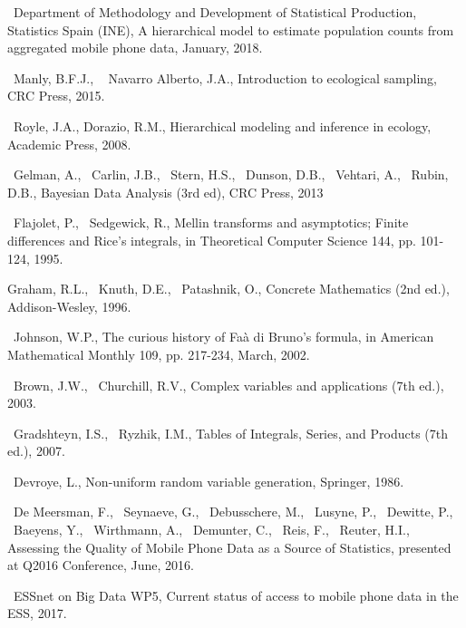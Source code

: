 \documentclass[12pt, a4paper]{article}
\begin{document}
\begin{thebibliography}{99}

~Department of Methodology and Development of Statistical Production, Statistics Spain (INE), 
A hierarchical model to estimate population counts from
aggregated mobile phone data, January, 2018.

~Manly, B.F.J., ~ Navarro Alberto, J.A., Introduction to ecological sampling,
CRC Press, 2015.

~Royle, J.A., Dorazio, R.M., Hierarchical modeling and inference in ecology,
Academic Press, 2008.

~Gelman, A., ~Carlin, J.B., ~Stern, H.S., ~Dunson, D.B., ~Vehtari, A., ~Rubin, D.B., Bayesian Data Analysis (3rd ed), CRC Press, 2013

~Flajolet, P., ~Sedgewick, R.,  Mellin transforms and asymptotics; Finite differences and Rice's integrals,
in  Theoretical Computer Science 144, pp. 101-124, 1995.

Graham, R.L., ~Knuth, D.E., ~Patashnik, O., Concrete Mathematics (2nd ed.), 
Addison-Wesley, 1996.

~Johnson, W.P., The curious history of Faà di Bruno's formula, in 
American Mathematical Monthly 109, pp. 217-234, March, 2002.

~Brown, J.W., ~Churchill, R.V., Complex variables and applications (7th ed.), 2003.

~Gradshteyn, I.S., ~Ryzhik, I.M., Tables of Integrals, Series, and Products (7th ed.),
2007.

~Devroye, L., Non-uniform random variable generation, Springer, 1986.

~De Meersman, F., ~Seynaeve, G., ~Debusschere, M., ~Lusyne, P., ~Dewitte, P., 
~Baeyens, Y., ~Wirthmann, A., ~Demunter, C., ~Reis, F., ~Reuter, H.I.,
Assessing the Quality of Mobile Phone Data as a Source of Statistics,
presented at Q2016 Conference, June, 2016.

~ESSnet on Big Data WP5, Current status of access to mobile phone data in the ESS, 2017.
 
\end{thebibliography}
\end{document}
